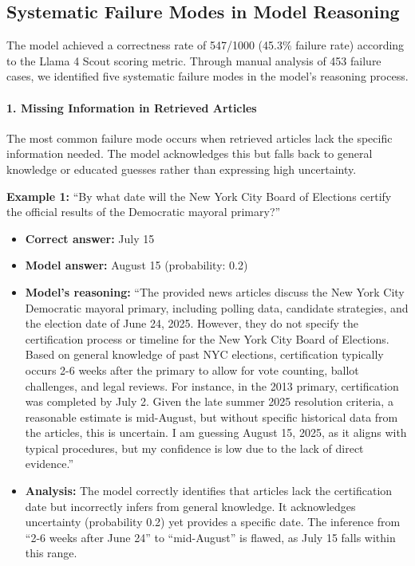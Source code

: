 \subsection{Systematic Failure Modes in Model Reasoning}

The model achieved a correctness rate of 547/1000 (45.3\% failure rate) according to the Llama 4 Scout scoring metric. Through manual analysis of 453 failure cases, we identified five systematic failure modes in the model's reasoning process.

\paragraph{1. Missing Information in Retrieved Articles}

The most common failure mode occurs when retrieved articles lack the specific information needed. The model acknowledges this but falls back to general knowledge or educated guesses rather than expressing high uncertainty.

\textbf{Example 1:} ``By what date will the New York City Board of Elections certify the official results of the Democratic mayoral primary?''

\begin{itemize}
\item \textbf{Correct answer:} July 15
\item \textbf{Model answer:} August 15 (probability: 0.2)
\item \textbf{Model's reasoning:} ``The provided news articles discuss the New York City Democratic mayoral primary, including polling data, candidate strategies, and the election date of June 24, 2025. However, they do not specify the certification process or timeline for the New York City Board of Elections. Based on general knowledge of past NYC elections, certification typically occurs 2-6 weeks after the primary to allow for vote counting, ballot challenges, and legal reviews. For instance, in the 2013 primary, certification was completed by July 2. Given the late summer 2025 resolution criteria, a reasonable estimate is mid-August, but without specific historical data from the articles, this is uncertain. I am guessing August 15, 2025, as it aligns with typical procedures, but my confidence is low due to the lack of direct evidence.''
\item \textbf{Analysis:} The model correctly identifies that articles lack the certification date but incorrectly infers from general knowledge. It acknowledges uncertainty (probability 0.2) yet provides a specific date. The inference from ``2-6 weeks after June 24'' to ``mid-August'' is flawed, as July 15 falls within this range.
\end{itemize}

